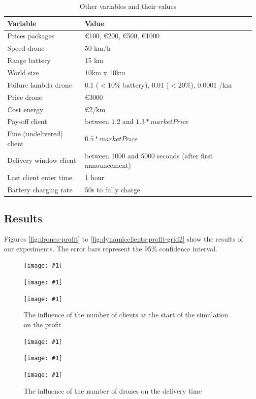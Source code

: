 \documentclass[10pt,a4paper,twocolumn]{article}
\newcommand{\MASplotHelper}[2]{
	\centering
	\texttt{[image: \#1]}
	\caption{#2}
	\label{fig:#1}
}
\newcommand{\MASplotThree}[6]{
\begin{figure}[htp]
    \centering
    \begin{minipage}{\columnwidth}
        \MASplotHelper{#1}{#2}
    \end{minipage}
    \begin{minipage}{\columnwidth}
        \MASplotHelper{#3}{#4}
    \end{minipage}
    \begin{minipage}{\columnwidth}
        \MASplotHelper{#5}{#6}
    \end{minipage}
\end{figure}
}
\begin{document}
\begin{table}[htp]
	\begin{center}
		\begin{tabular}{ p{}p{} }
			\hline
			Variable & Value \\ \hline
			Prices packages & \euro{100}, \euro{200}, \euro{500}, \euro{1000} \\
			Speed drone & 50 km/h \\
			Range battery & 15 km \\
			World size & 10km x 10km \\
			Failure lambda drone & 0.1 \small($< 10\%$ battery)\normalsize, 0.01 \small($< 20\%$)\normalsize, 0.0001 /km\\
			Price drone & \euro{3000} \\
			Cost energy & \euro{2}/km \\
			Pay-off client & between $1.2$ and $1.3 * marketPrice$ \\
			Fine (undelivered) client & $0.5 * marketPrice$ \\
			Delivery window client & between 1000 and 5000 seconds (after first announcement) \\
			Last client enter time & 1 hour \\
			Battery charging rate & 50s to fully charge \\
			\hline
		\end{tabular}
	\end{center}
	\caption{Other variables and their values}
	\label{tbl:other}
\end{table}

\subsection{Results}
Figures \ref{fig:drones-profit} to \ref{fig:dynamicclients-profit-grid2} show the results of our experiments. The error bars represent the 95\% confidence interval.

\MASplotThree
{drones-profit}{The influence of the number of drones on the profit}
{warehouses-profit}{The influence of the number of warehouses on the profit}
{initialclients-profit}{The influence of the number of clients at the start of the simulation on the profit}

\MASplotThree
{dynamicclients-profit}{The influence of the number of clients that appear after the start of the simulation on the profit}
{dynamicclients-profit-largeNbDrones}{The influence of the number of clients that appear after the start of the simulation on the profit, with a large number of drones}
{drones-deliverytime}{The influence of the number of drones on the delivery time}
\end{document}
